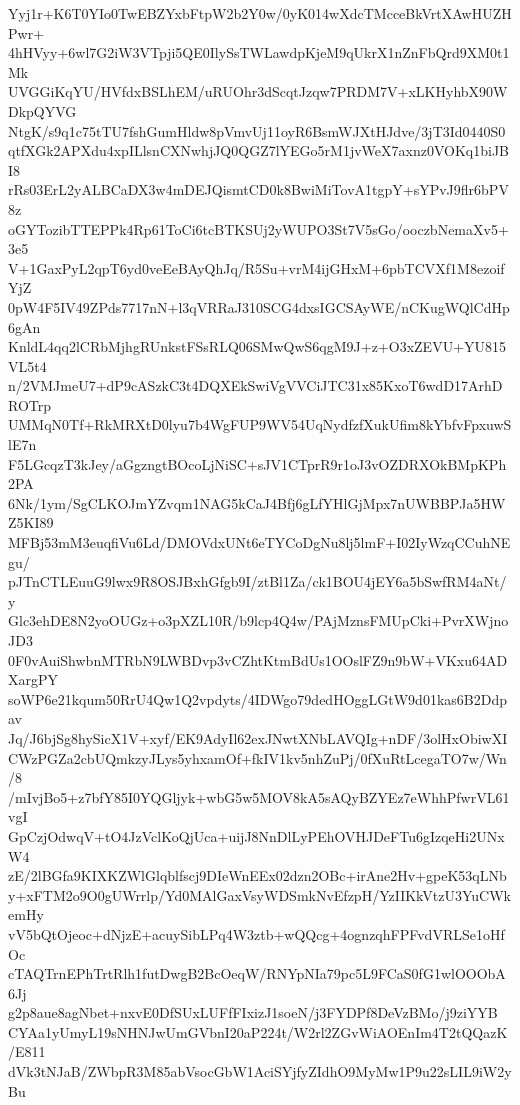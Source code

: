 Yyj1r+K6T0YIo0TwEBZYxbFtpW2b2Y0w/0yK014wXdcTMcceBkVrtXAwHUZHPwr+
4hHVyy+6wl7G2iW3VTpji5QE0IlySsTWLawdpKjeM9qUkrX1nZnFbQrd9XM0t1Mk
UVGGiKqYU/HVfdxBSLhEM/uRUOhr3dScqtJzqw7PRDM7V+xLKHyhbX90WDkpQYVG
NtgK/s9q1c75tTU7fshGumHldw8pVmvUj11oyR6BsmWJXtHJdve/3jT3Id0440S0
qtfXGk2APXdu4xpILlsnCXNwhjJQ0QGZ7lYEGo5rM1jvWeX7axnz0VOKq1biJBI8
rRs03ErL2yALBCaDX3w4mDEJQismtCD0k8BwiMiTovA1tgpY+sYPvJ9flr6bPV8z
oGYTozibTTEPPk4Rp61ToCi6tcBTKSUj2yWUPO3St7V5sGo/ooczbNemaXv5+3e5
V+1GaxPyL2qpT6yd0veEeBAyQhJq/R5Su+vrM4ijGHxM+6pbTCVXf1M8ezoifYjZ
0pW4F5IV49ZPds7717nN+l3qVRRaJ310SCG4dxsIGCSAyWE/nCKugWQlCdHp6gAn
KnldL4qq2lCRbMjhgRUnkstFSsRLQ06SMwQwS6qgM9J+z+O3xZEVU+YU815VL5t4
n/2VMJmeU7+dP9cASzkC3t4DQXEkSwiVgVVCiJTC31x85KxoT6wdD17ArhDROTrp
UMMqN0Tf+RkMRXtD0lyu7b4WgFUP9WV54UqNydfzfXukUfim8kYbfvFpxuwSlE7n
F5LGcqzT3kJey/aGgzngtBOcoLjNiSC+sJV1CTprR9r1oJ3vOZDRXOkBMpKPh2PA
6Nk/1ym/SgCLKOJmYZvqm1NAG5kCaJ4Bfj6gLfYHlGjMpx7nUWBBPJa5HWZ5KI89
MFBj53mM3euqfiVu6Ld/DMOVdxUNt6eTYCoDgNu8lj5lmF+I02IyWzqCCuhNEgu/
pJTnCTLEuuG9lwx9R8OSJBxhGfgb9I/ztBl1Za/ck1BOU4jEY6a5bSwfRM4aNt/y
Glc3ehDE8N2yoOUGz+o3pXZL10R/b9lcp4Q4w/PAjMznsFMUpCki+PvrXWjnoJD3
0F0vAuiShwbnMTRbN9LWBDvp3vCZhtKtmBdUs1OOslFZ9n9bW+VKxu64ADXargPY
soWP6e21kqum50RrU4Qw1Q2vpdyts/4IDWgo79dedHOggLGtW9d01kas6B2Ddpav
Jq/J6bjSg8hySicX1V+xyf/EK9AdyIl62exJNwtXNbLAVQIg+nDF/3olHxObiwXI
CWzPGZa2cbUQmkzyJLys5yhxamOf+fkIV1kv5nhZuPj/0fXuRtLcegaTO7w/Wn/8
/mIvjBo5+z7bfY85I0YQGljyk+wbG5w5MOV8kA5sAQyBZYEz7eWhhPfwrVL61vgI
GpCzjOdwqV+tO4JzVclKoQjUca+uijJ8NnDlLyPEhOVHJDeFTu6gIzqeHi2UNxW4
zE/2lBGfa9KIXKZWlGlqblfscj9DIeWnEEx02dzn2OBc+irAne2Hv+gpeK53qLNb
y+xFTM2o9O0gUWrrlp/Yd0MAlGaxVsyWDSmkNvEfzpH/YzIIKkVtzU3YuCWkemHy
vV5bQtOjeoc+dNjzE+acuySibLPq4W3ztb+wQQcg+4ognzqhFPFvdVRLSe1oHfOc
cTAQTrnEPhTrtRlh1futDwgB2BcOeqW/RNYpNIa79pc5L9FCaS0fG1wlOOObA6Jj
g2p8aue8agNbet+nxvE0DfSUxLUFfFIxizJ1soeN/j3FYDPf8DeVzBMo/j9ziYYB
CYAa1yUmyL19sNHNJwUmGVbnI20aP224t/W2rl2ZGvWiAOEnIm4T2tQQazK/E811
dVk3tNJaB/ZWbpR3M85abVsocGbW1AciSYjfyZIdhO9MyMw1P9u22sLIL9iW2yBu
